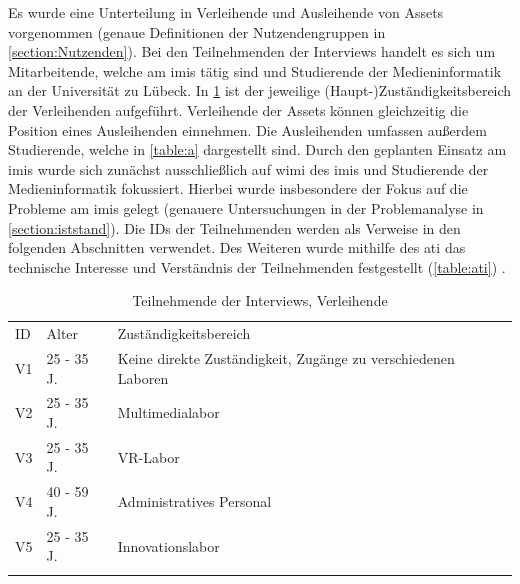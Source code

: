Es wurde eine Unterteilung in Verleihende und Ausleihende von Assets vorgenommen (genaue
Definitionen der Nutzendengruppen in \ref{section:Nutzenden}). Bei den Teilnehmenden der Interviews
handelt es sich um Mitarbeitende, welche am \ac{imis} tätig sind und Studierende der
Medieninformatik an der Universität zu Lübeck. In \ref{table:v} ist der jeweilige
(Haupt-)Zuständigkeitsbereich der Verleihenden aufgeführt. Verleihende der Assets können
gleichzeitig die Position eines Ausleihenden einnehmen. Die Ausleihenden umfassen außerdem
Studierende, welche in \ref{table:a} dargestellt sind. Durch den geplanten Einsatz am \ac{imis}
wurde sich zunächst ausschließlich auf \ac{wimi} des \ac{imis} und Studierende der Medieninformatik
fokussiert. Hierbei wurde insbesondere der Fokus auf die Probleme am \ac{imis} gelegt (genauere
Untersuchungen in der Problemanalyse in \ref{section:iststand}). Die IDs der Teilnehmenden werden
als Verweise in den folgenden Abschnitten verwendet. Des Weiteren wurde mithilfe des \ac{ati} das
technische Interesse und Verständnis der Teilnehmenden festgestellt (\ref{table:ati})
\cite{attig_assessing_2017}.


\begin{table}[h]
        \centering
        \caption{Teilnehmende der Interviews, Verleihende}
        \begin{tabular}{lll}
                \arrayrulecolor{maincolor}\hline
                \sffamily\color{maincolor}ID & \sffamily\color{maincolor}Alter &
                \sffamily\color{maincolor}Zuständigkeitsbereich                                   \\
                \arrayrulecolor{maincolor}\hline
                V1                           & 25 - 35 J.                      & Keine direkte
                Zuständigkeit, Zugänge zu verschiedenen Laboren                                   \\
                V2                           & 25 - 35 J.                      & Multimedialabor
                \\
                V3                           & 25 - 35 J.                      & VR-Labor
                \\
                V4                           & 40 - 59 J.                      & Administratives
                Personal                                                                          \\
                V5                           & 25 - 35 J.                      & Innovationslabor
                \\
                \arrayrulecolor{maincolor}\hline
        \end{tabular}
        \label{table:v}
\end{table}

